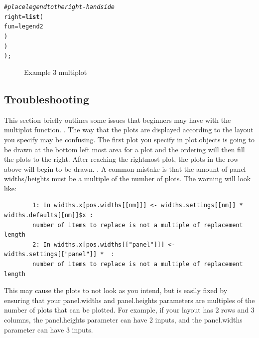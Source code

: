 \documentclass[letterpaper]{report}\usepackage[]{graphicx}\usepackage[]{color}
\makeatletter
\newcommand{\hlcom}[1]{\textcolor[rgb]{0.678,0.584,0.686}{\textit{#1}}}%
\newcommand{\hlstd}[1]{\textcolor[rgb]{0.345,0.345,0.345}{#1}}%
\newcommand{\hlkwc}[1]{\textcolor[rgb]{0.333,0.667,0.333}{#1}}%
\newcommand{\hlkwd}[1]{\textcolor[rgb]{0.737,0.353,0.396}{\textbf{#1}}}%
\newenvironment{kframe}{%
 \def\at@end@of@kframe{}%
 \ifinner\ifhmode%
  \def\at@end@of@kframe{\end{minipage}}%
  \begin{minipage}{\columnwidth}%
 \fi\fi%
 \def\FrameCommand##1{\hskip\@totalleftmargin \hskip-\fboxsep
 \colorbox{shadecolor}{##1}\hskip-\fboxsep
     \hskip-\linewidth \hskip-\@totalleftmargin \hskip\columnwidth}%
 \MakeFramed {\advance\hsize-\width
   \@totalleftmargin\z@ \linewidth\hsize
   \@setminipage}}%
 {\par\unskip\endMakeFramed%
 \at@end@of@kframe}
\newenvironment{knitrout}{}{} %
\makeatother
\begin{document}
\begin{knitrout}
\begin{kframe}
\begin{alltt}
        \hlcom{# place legend to the right-hand side}
        \hlkwc{right} \hlstd{=} \hlkwd{list}\hlstd{(}
                \hlkwc{fun} \hlstd{= legend2}
                \hlstd{)}
        \hlstd{)}
    \hlstd{);}
\end{alltt}
\end{kframe}\begin{figure}

{\centering {} 

}

\caption[Example 3 multiplot]{Example 3 multiplot\label{fig:multiplotex3_final}}
\end{figure}


\end{knitrout}

\subsection{Troubleshooting}
This section briefly outlines some issues that beginners may have with the multiplot function. 
\newline
{}. The way that the plots are displayed according to the layout you specify may be confusing. The first plot you specify in plot.objects is going to be drawn at the bottom left most area for a plot and the ordering will then fill the plots to the right. After reaching the rightmost plot, the plots in the row above will begin to be drawn. 
\newline
{}. A common mistake is that the amount of panel widths/heights must be a multiple of the number of plots. The warning will look like:

\begin{verbatim}
        1: In widths.x[pos.widths[[nm]]] <- widths.settings[[nm]] * widths.defaults[[nm]]$x : 
        number of items to replace is not a multiple of replacement length
        2: In widths.x[pos.widths[["panel"]]] <- widths.settings[["panel"]] *  :
        number of items to replace is not a multiple of replacement length
\end{verbatim}

This may cause the plots to not look as you intend, but is easily fixed by ensuring that your panel.widths and panel.heights parameters are multiples of the number of plots that can be plotted. For example, if your layout has 2 rows and 3 columns, the panel.heights parameter can have 2 inputs, and the panel.widths parameter can have 3 inputs.
\end{document}
